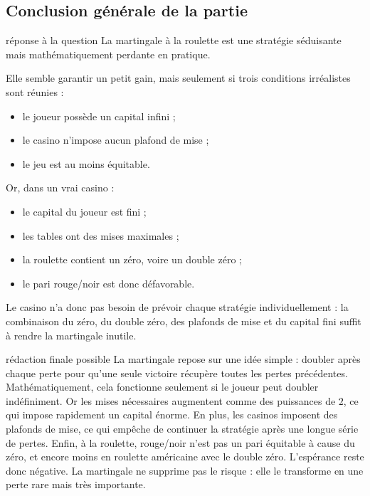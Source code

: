 \documentclass[11pt,a4paper]{article}
\begin{document}
\subsection{Conclusion générale de la partie}

\begin{conclusionbox}{réponse à la question}
La martingale à la roulette est une stratégie séduisante mais mathématiquement perdante en pratique.

Elle semble garantir un petit gain, mais seulement si trois conditions irréalistes sont réunies :
\begin{itemize}
    \item le joueur possède un capital infini ;
    \item le casino n'impose aucun plafond de mise ;
    \item le jeu est au moins équitable.
\end{itemize}

Or, dans un vrai casino :
\begin{itemize}
    \item le capital du joueur est fini ;
    \item les tables ont des mises maximales ;
    \item la roulette contient un zéro, voire un double zéro ;
    \item le pari rouge/noir est donc défavorable.
\end{itemize}

Le casino n'a donc pas besoin de prévoir chaque stratégie individuellement : la combinaison du zéro, du double zéro, des plafonds de mise et du capital fini suffit à rendre la martingale inutile.
\end{conclusionbox}

\begin{oral}{rédaction finale possible}
La martingale repose sur une idée simple : doubler après chaque perte pour qu'une seule victoire récupère toutes les pertes précédentes. Mathématiquement, cela fonctionne seulement si le joueur peut doubler indéfiniment. Or les mises nécessaires augmentent comme des puissances de \(2\), ce qui impose rapidement un capital énorme. En plus, les casinos imposent des plafonds de mise, ce qui empêche de continuer la stratégie après une longue série de pertes. Enfin, à la roulette, rouge/noir n'est pas un pari équitable à cause du zéro, et encore moins en roulette américaine avec le double zéro. L'espérance reste donc négative. La martingale ne supprime pas le risque : elle le transforme en une perte rare mais très importante.
\end{oral}
\end{document}
